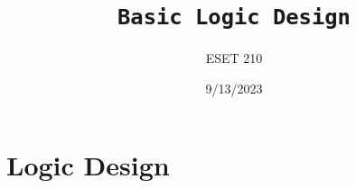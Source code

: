 \documentclass[a4paper,12pt]{article}
\title{\texttt{Basic Logic Design}\\\hrulefill}
\author{ESET 210}
\date{\small{9/13/2023}}
\begin{document}
    \maketitle

    \section{Logic Design}
\end{document}
